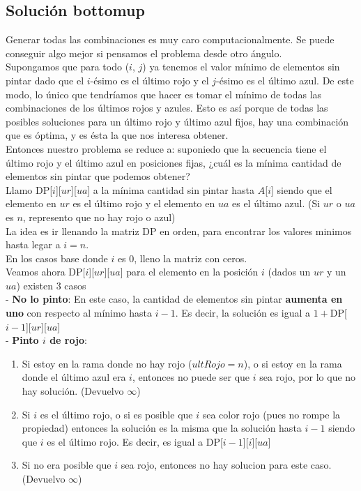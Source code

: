 \subsection{Solución bottomup}

Generar todas las combinaciones es muy caro computacionalmente. Se puede conseguir algo mejor si pensamos el problema desde otro ángulo. \\

Supongamos que para todo ($i$, $j$) ya tenemos el valor mínimo de elementos sin pintar dado que el $i$-ésimo es el último rojo y el $j$-ésimo es el último azul. De este modo, lo único que tendríamos que hacer es tomar el mínimo de todas las combinaciones de los últimos rojos y azules. Esto es así porque de todas las posibles soluciones para un último rojo y último azul fijos, hay una combinación que es óptima, y es ésta la que nos interesa obtener. \\

Entonces nuestro problema se reduce a: suponiedo que la secuencia tiene el último rojo y el último azul en posiciones fijas, ¿cuál es la mínima cantidad de elementos sin pintar que podemos obtener? \\

Llamo DP[$i$][$ur$][$ua$] a la mínima cantidad sin pintar hasta $A$[$i$] siendo que el elemento en $ur$ es el último rojo y el elemento en $ua$ es el último azul. (Si $ur$ o $ua$ es $n$, represento que no hay rojo o azul) \\

La idea es ir llenando la matriz DP en orden, para encontrar los valores minimos hasta legar a $i = n$. \\

En los casos base donde $i$ es 0, lleno la matriz con ceros. \\

Veamos ahora DP[$i$][$ur$][$ua$] para el elemento en la posición $i$ (dados un $ur$ y un $ua$) existen 3 casos \\

- \textbf{No lo pinto}: En este caso, la cantidad de elementos sin pintar \textbf{aumenta en uno} con respecto al mínimo hasta $i-1$. Es decir, la solución es igual a $1 + $DP[$i-1$][$ur$][$ua$] \\

- \textbf{Pinto $i$ de rojo}: 
\begin{enumerate}
\item Si estoy en la rama donde no hay rojo ($ultRojo = n$), o si estoy en la rama donde el último azul era $i$, entonces no puede ser que $i$ sea rojo, por lo que no hay solución. (Devuelvo $\infty$)
\item Si $i$ es el último rojo, o si es posible que $i$ sea color rojo (pues no rompe la propiedad) entonces la solución es la misma que la solución hasta $i-1$ siendo que $i$ es el último rojo. Es decir, es igual a DP[$i-1$][$i$][$ua$]
\item Si no era posible que $i$ sea rojo, entonces no hay solucion para este caso. (Devuelvo $\infty$)
\end{enumerate} 


